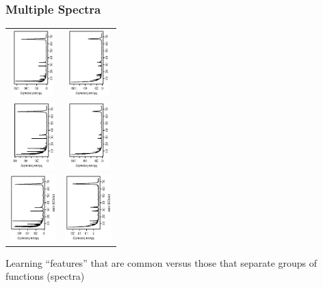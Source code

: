 \documentclass[dvips]{beamer}
\newcommand{\bs}[2]{\begin{frame} \frametitle{#1} 
{#2}
\end{frame} }
\begin{document}
\bs{Multiple Spectra} {
\begin{center}
\begin{tabular}{cc}
\includegraphics[height=1in,angle=-90]{RawSpecCont_n4_allFrcAvg_22.ps}&
\includegraphics[height=1in,angle=-90]{RawSpecDis_n15_allFrcAvg_22.ps}\vspace{-.2in}\\
\includegraphics[height=1in,angle=-90]{RawSpecCont_n2_allFrcAvg_22.ps}&
\includegraphics[height=1in,angle=-90]{RawSpecDis_n14_allFrcAvg_22.ps}\vspace{-.2in}\\
\includegraphics[height=1in,angle=-90]{RawSpecCont_n1_allFrcAvg_22.ps}&
\includegraphics[height=1in,angle=-90]{RawSpecDis_n11_allFrcAvg_22.ps}
\end{tabular}
\end{center}

Learning ``features'' that are common versus those that separate groups of  functions (spectra)

}
\end{document}
